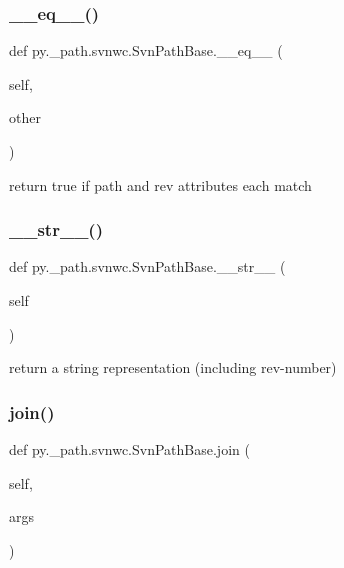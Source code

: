 \subsubsection{\texorpdfstring{\+\_\+\+\_\+eq\+\_\+\+\_\+()}{\_\_eq\_\_()}}
{\footnotesize\ttfamily def py.\+\_\+path.\+svnwc.\+Svn\+Path\+Base.\+\_\+\+\_\+eq\+\_\+\+\_\+ (\begin{DoxyParamCaption}\item[{}]{self,  }\item[{}]{other }\end{DoxyParamCaption})}

\begin{DoxyVerb}return true if path and rev attributes each match \end{DoxyVerb}
 \mbox{\label{classpy_1_1__path_1_1svnwc_1_1_svn_path_base_a0f7dcb869c2ffcfb3ff3a0c46138d0e8}} 
\subsubsection{\texorpdfstring{\+\_\+\+\_\+str\+\_\+\+\_\+()}{\_\_str\_\_()}}
{\footnotesize\ttfamily def py.\+\_\+path.\+svnwc.\+Svn\+Path\+Base.\+\_\+\+\_\+str\+\_\+\+\_\+ (\begin{DoxyParamCaption}\item[{}]{self }\end{DoxyParamCaption})}

\begin{DoxyVerb}return a string representation (including rev-number) \end{DoxyVerb}
 \mbox{\label{classpy_1_1__path_1_1svnwc_1_1_svn_path_base_a9b5a335ea1286ea33f8cf6cb2ea470bb}} 
\subsubsection{\texorpdfstring{join()}{join()}}
{\footnotesize\ttfamily def py.\+\_\+path.\+svnwc.\+Svn\+Path\+Base.\+join (\begin{DoxyParamCaption}\item[{}]{self,  }\item[{}]{args }\end{DoxyParamCaption})}

